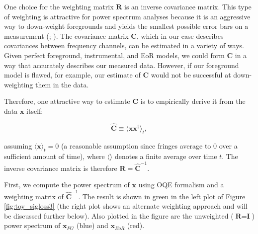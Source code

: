\documentclass[preprint2,numberedappendix,tighten]{aastex6}  %
\begin{document}
One choice for the weighting matrix $\textbf{R}$ is an inverse covariance matrix. This type of weighting is attractive for power 
spectrum analyses because it is an aggressive way to down-weight foregrounds and yields the smallest possible error bars on 
a measurement (\citealt{tegmark_et_al1997a}; \citealt{bond_et_al1998}). The covariance matrix $\textbf{C}$, which in our case 
describes covariances between frequency channels, can be estimated in a variety of ways. Given perfect foreground, 
instrumental, and EoR models, we could form $\textbf{C}$ in a way that accurately describes our measured data. However, if 
our foreground model is flawed, for example, our estimate of $\textbf{C}$ would not be successful at down-weighting them in 
the data. 

Therefore, one attractive way to estimate $\textbf{C}$ is to empirically derive it from the data $\textbf{x}$ itself:

\begin{equation}
\hat{\textbf{C}} \equiv \langle\textbf{xx}^{\dagger}\rangle_{t},
\end{equation}

\noindent assuming $\langle\textbf{x}\rangle_{t} = 0$ (a reasonable assumption since fringes average to $0$ over a sufficient 
amount of time), where $\langle \rangle$ denotes a finite average over time $t$. The inverse covariance matrix is therefore $
\textbf{R} = \hat{\textbf{C}}^{-1}$. 

First, we compute the power spectrum of $\textbf{x}$ using OQE formalism and a weighting matrix of $\hat{\textbf{C}}^{-1}$. 
The result is shown in green in the left plot of Figure \ref{fig:toy_sigloss3} (the right plot shows an alternate weighting approach 
and will be discussed further below). Also plotted in the figure are the unweighted ($\textbf{R} = \textbf{I}$) power spectrum of $
\textbf{x}_{FG}$ (blue) and $\textbf{x}_{EoR}$ (red). 
\end{document}
